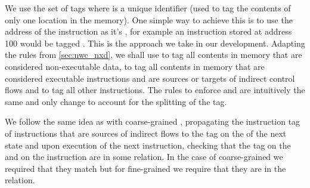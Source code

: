 We use the set of tags 
where \id is a unique identifier (\IE used to tag the contents of only
one location in the memory). One simple way to achieve this is to use
the address of the instruction as it's \id, for example an instruction
stored at address 100 would be tagged . This is the
approach we take in our development. Adapting the rules from
\ref{sec:nwc_nxd}, we shall use \DATAname to tag all contents in
memory that are considered non-executable data,  to tag
all contents in memory that are considered executable instructions and
are sources or targets of indirect control flows and \INSTR{$\bot$} to
tag all other instructions. The rules to enforce \NWC and \NXD are
intuitively the same and only change to account for the splitting of
the \INSTRname tag.


We follow the same idea as with coarse-grained \CFI{},
propagating the
instruction tag of instructions that are sources of indirect flows to
the tag on the \pc of the next state and upon execution of the next
instruction, checking that the tag on the \pc and on the instruction
are in some relation. In the case of coarse-grained \CFI we required
that they match but for fine-grained \CFI we require that they are in
the \CFG relation.


